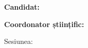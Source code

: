 \begin{titlepage}
\thispagestyle{titlepagestyle}
    \begin{center}
        \vspace*{\fill}
        \textbf{\fontsize{20pt}{30pt} \selectfont \MakeUppercase{\thesisTitle}}
    \end{center}
    
    \vspace*{\fill}
     
            
    \textbf{\fontsize{14pt}{16pt} \selectfont Candidat: \candidateName}
    
    \vspace{14pt}
    
    \textbf{\fontsize{14pt}{16pt} \selectfont Coordonator științific: \coordinator}

    \begin{center}
        \vspace{50pt}
        \fontsize{14pt}{16pt} \selectfont Sesiunea: \monthOfPresentation{} \academicYear 
    \end{center}
    

\end{titlepage}